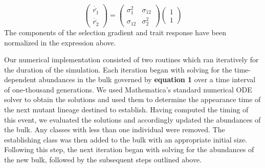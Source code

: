 \documentclass[11pt,twocolumn]{article}
\begin{document}
% 
% 
% 
% 
% 
% 
\begin{equation}
\left(
\begin{array}{c}
\dot{\bar{r_1}} \\
\dot{\bar{r_2}} 
\end{array}
\right)
=
\left(
\begin{array}{cc}
\sigma_1^2 & \sigma_{12} \\
\sigma_{12} & \sigma_2^2 
\end{array}
\right)
\left(
\begin{array}{c}
1 \\
1 
\end{array}
\right)
\end{equation}
The components of the selection gradient and trait response have been normalized in the expression above.  

Our numerical implementation consisted of two routines which ran iteratively for the duration of the simulation. Each iteration began with solving for the time-dependent abundances in the bulk governed by \textbf{equation 1} over a time interval of one-thousand generations. We used Mathematica's standard numerical ODE solver to obtain the solutions and used them to determine the appearance time of the next mutant lineage destined to establish. Having computed the timing of this event, we evaluated the solutions and accordingly updated the abundances of the bulk. Any classes with less than one individual were removed.  The establishing class was then added to the bulk with an appropriate initial size. Following this step, the next iteration began with solving for the abundances of the new bulk, followed by the subsequent steps outlined above.\par
\end{document}
